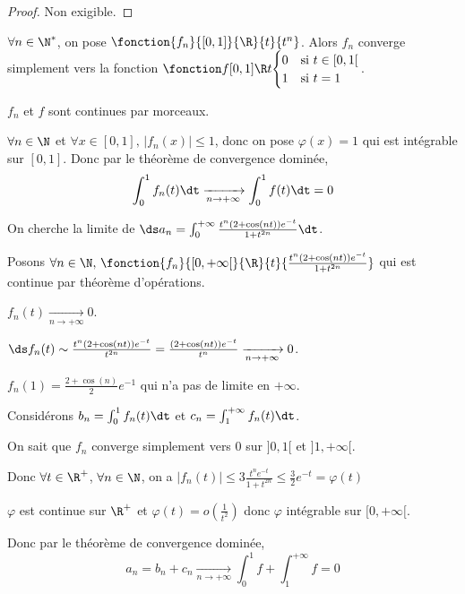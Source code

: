 \begin{proof}
    Non exigible. 
\end{proof}

\begin{exemple}
    $\forall n \in \N^*$, on pose $\fonction {f_n}{[0, 1]}{\R}{t}{t^n}$. 
    Alors $f_n$ converge simplement vers la fonction $\fonction f {[0, 1]}{\R}{t}{\begin{cases}
        0 & \text{si } t \in [0, 1[ \\
        1 & \text{si } t = 1
    \end{cases}}$.

    \svspace $f_n$ et $f$ sont continues par morceaux. 

    $\forall n \in \N$ et $\forall x \in [0, 1], \, |f_n(x)| \leqslant 1$, donc on pose 
    $\varphi(x) = 1$ qui est intégrable sur $[0, 1]$. Donc par le théorème de convergence 
    dominée, $$\int_0^1 f_n(t) \dt \xrightarrow[n \to + \infty]{} \int_0^1 f(t) \dt = 0$$
\end{exemple}

\begin{exemple}
    On cherche la limite de $\ds a_n = \int_{0 }^{ + \infty } \frac{t^n(2 + \cos (nt)) e^{-t}}{1 + t^{2n}} \dt$.

    \svspace Posons $\forall n \in \N, \, \fonction {f_n}{[0, + \infty[}{\R}{t}{\frac{t^n(2 + \cos (nt)) e^{-t}}{1 + t^{2n}}}$ qui
    est continue par théorème d'opérations.


    \avspace $f_n(t) \xrightarrow[n \to + \infty]{} 0$.


    \avspace $\ds f_n(t) \sim \frac{t^n(2 + \cos(nt))e^{-t}}{t^{2n}} = \frac{(2 + \cos(nt))e^{-t}}{t^n} \xrightarrow[n \to + \infty]{} 0$.

    $f_n(1) = \frac{2 + \cos(n)}{2}e^{-1}$ qui n'a pas de limite en $+\infty$. 

    Considérons $b_n = \int_0^1 f_n(t) \dt$ et $c_n = \int_1^{+ \infty} f_n(t) \dt$.

    On sait que $f_n$ converge simplement vers $0$ sur $]0, 1[$ et $]1, + \infty[$.

    Donc $\forall t \in \R^+$, $\forall n \in \N$, on a $|f_n(t)| \leqslant 3 \frac{t^n e^{-t}}{1 + t^{2n}} \leqslant \frac 3 2 e^{-t} = \varphi(t)$

    $\varphi$ est continue sur $\R^+$ et $\varphi(t) = o\left( \frac 1 {t^2} \right)$ donc $\varphi$ 
    intégrable sur $[0, + \infty[$.

    Donc par le théorème de convergence dominée, $$a_n = b_n + c_n \xrightarrow[n \to + \infty]{} \int_{0}^{1} f + \int_1^{+ \infty} f = 0$$
\end{exemple}

